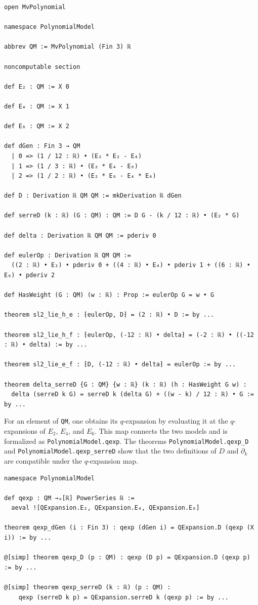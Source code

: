 \documentclass[10pt,reqno]{amsproc}
\newcommand{\1}{\mathds{1}}	%
\theoremstyle{definition}
\theoremstyle{remark}
\begin{document}
\begin{lstlisting}[language=lean]
open MvPolynomial

namespace PolynomialModel

abbrev QM := MvPolynomial (Fin 3) ℝ

noncomputable section

def E₂ : QM := X 0

def E₄ : QM := X 1

def E₆ : QM := X 2

def dGen : Fin 3 → QM
  | 0 => (1 / 12 : ℝ) • (E₂ * E₂ - E₄)
  | 1 => (1 / 3 : ℝ) • (E₂ * E₄ - E₆)
  | 2 => (1 / 2 : ℝ) • (E₂ * E₆ - E₄ * E₄)

def D : Derivation ℝ QM QM := mkDerivation ℝ dGen

def serreD (k : ℝ) (G : QM) : QM := D G - (k / 12 : ℝ) • (E₂ * G)

def delta : Derivation ℝ QM QM := pderiv 0

def eulerOp : Derivation ℝ QM QM :=
  ((2 : ℝ) • E₂) • pderiv 0 + ((4 : ℝ) • E₄) • pderiv 1 + ((6 : ℝ) • E₆) • pderiv 2

def HasWeight (G : QM) (w : ℝ) : Prop := eulerOp G = w • G

theorem sl2_lie_h_e : ⁅eulerOp, D⁆ = (2 : ℝ) • D := by ...

theorem sl2_lie_h_f : ⁅eulerOp, (-12 : ℝ) • delta⁆ = (-2 : ℝ) • ((-12 : ℝ) • delta) := by ...

theorem sl2_lie_e_f : ⁅D, (-12 : ℝ) • delta⁆ = eulerOp := by ...

theorem delta_serreD {G : QM} {w : ℝ} (k : ℝ) (h : HasWeight G w) :
  delta (serreD k G) = serreD k (delta G) + ((w - k) / 12 : ℝ) • G := by ...
\end{lstlisting}


For an element of \lstinline|QM|, one obtains its $q$-expansion by evaluating it at the $q$-expansions of $E_2$, $E_4$, and $E_6$.
This map connects the two models and is formalized as \lstinline|PolynomialModel.qexp|.
The theorems \lstinline|PolynomialModel.qexp_D| and \lstinline|PolynomialModel.qexp_serreD| show that the two definitions of $D$ and $\partial_k$ are compatible under the $q$-expansion map.

\begin{lstlisting}[language=lean]
namespace PolynomialModel

def qexp : QM →ₐ[ℝ] PowerSeries ℝ :=
  aeval ![QExpansion.E₂, QExpansion.E₄, QExpansion.E₆]

theorem qexp_dGen (i : Fin 3) : qexp (dGen i) = QExpansion.D (qexp (X i)) := by ...

@[simp] theorem qexp_D (p : QM) : qexp (D p) = QExpansion.D (qexp p) := by ...

@[simp] theorem qexp_serreD (k : ℝ) (p : QM) :
    qexp (serreD k p) = QExpansion.serreD k (qexp p) := by ...
\end{lstlisting}
\end{document}
